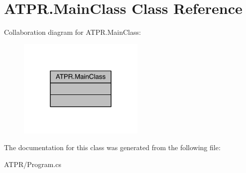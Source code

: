 \hypertarget{class_a_t_p_r_1_1_main_class}{}\section{A\+T\+P\+R.\+Main\+Class Class Reference}
\label{class_a_t_p_r_1_1_main_class}


Collaboration diagram for A\+T\+P\+R.\+Main\+Class\+:
\nopagebreak
\begin{figure}[H]
\begin{center}
\leavevmode
\includegraphics[width=171pt]{d8/dbc/class_a_t_p_r_1_1_main_class__coll__graph}
\end{center}
\end{figure}


The documentation for this class was generated from the following file\+:\begin{DoxyCompactItemize}
\item 
A\+T\+P\+R/Program.\+cs\end{DoxyCompactItemize}
